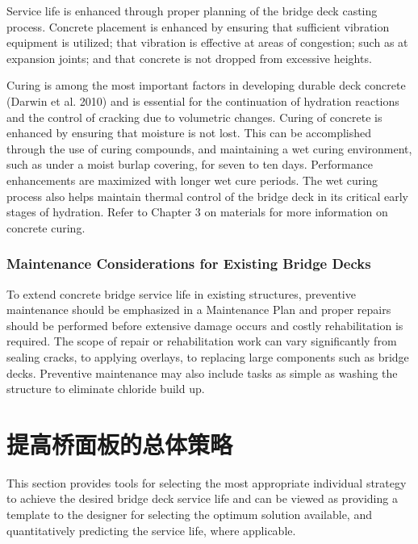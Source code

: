 Service life is enhanced through proper planning of the bridge deck casting process. Concrete placement is
enhanced by ensuring that sufficient vibration equipment is utilized; that vibration is effective at areas of congestion;
such as at expansion joints; and that concrete is not dropped from excessive heights.

Curing is among the most important factors in developing durable deck concrete (Darwin et al. 2010) and is
essential for the continuation of hydration reactions and the control of cracking due to volumetric changes. Curing of
concrete is enhanced by ensuring that moisture is not lost. This can be accomplished through the use of curing
compounds, and maintaining a wet curing environment, such as under a moist burlap covering, for seven to ten days.
Performance enhancements are maximized with longer wet cure periods. The wet curing process also helps maintain
thermal control of the bridge deck in its critical early stages of hydration. Refer to Chapter 3 on materials for more
information on concrete curing.

\subsubsection{Maintenance Considerations for Existing Bridge Decks}

To extend concrete bridge service life in existing structures, preventive maintenance should be emphasized in a
Maintenance Plan and proper repairs should be performed before extensive damage occurs and costly rehabilitation is
required. The scope of repair or rehabilitation work can vary significantly from sealing cracks, to applying overlays, to replacing large components such as bridge decks. Preventive maintenance may also include tasks as simple as
washing the structure to eliminate chloride build up.



\section{提高桥面板的总体策略}
\label{sec:overall-strategy}

This section provides tools for selecting the most appropriate individual strategy to achieve the desired bridge
deck service life and can be viewed as providing a template to the designer for selecting the optimum solution
available, and quantitatively predicting the service life, where applicable.

